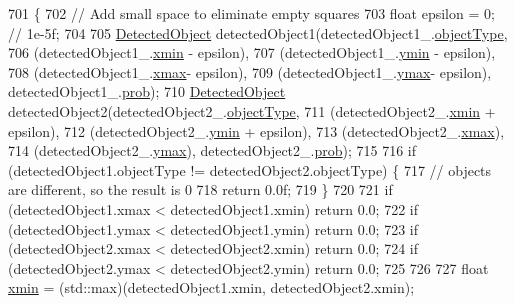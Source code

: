 \begin{DoxyCode}
701                                                                                                      \{
702         \textcolor{comment}{// Add small space to eliminate empty squares}
703         \textcolor{keywordtype}{float} epsilon = 0;  \textcolor{comment}{// 1e-5f;}
704 
705         \hyperlink{classDetectedObject}{DetectedObject} detectedObject1(detectedObject1\_.\hyperlink{classDetectedObject_aff19c53a4ee1d27656acf6b6fbd9cfa0}{objectType},
706                 (detectedObject1\_.\hyperlink{classDetectedObject_af6a124efdbada32ae6cc6ed8207957ba}{xmin} - epsilon),
707                 (detectedObject1\_.\hyperlink{classDetectedObject_a18ef6bb15e7c47d41d9c2c9d4b8b133c}{ymin} - epsilon),
708                 (detectedObject1\_.\hyperlink{classDetectedObject_a8e120d3f08cb0f6c41b10a082bd0df04}{xmax}- epsilon),
709                 (detectedObject1\_.\hyperlink{classDetectedObject_ab130fc061e711904966077c8b8e294e7}{ymax}- epsilon), detectedObject1\_.\hyperlink{classDetectedObject_a1d49d73edce36d93ee88b202bdcb961d}{prob});
710         \hyperlink{classDetectedObject}{DetectedObject} detectedObject2(detectedObject2\_.\hyperlink{classDetectedObject_aff19c53a4ee1d27656acf6b6fbd9cfa0}{objectType},
711                 (detectedObject2\_.\hyperlink{classDetectedObject_af6a124efdbada32ae6cc6ed8207957ba}{xmin} + epsilon),
712                 (detectedObject2\_.\hyperlink{classDetectedObject_a18ef6bb15e7c47d41d9c2c9d4b8b133c}{ymin} + epsilon),
713                 (detectedObject2\_.\hyperlink{classDetectedObject_a8e120d3f08cb0f6c41b10a082bd0df04}{xmax}),
714                 (detectedObject2\_.\hyperlink{classDetectedObject_ab130fc061e711904966077c8b8e294e7}{ymax}), detectedObject2\_.\hyperlink{classDetectedObject_a1d49d73edce36d93ee88b202bdcb961d}{prob});
715 
716         \textcolor{keywordflow}{if} (detectedObject1.objectType != detectedObject2.objectType) \{
717             \textcolor{comment}{// objects are different, so the result is 0}
718             \textcolor{keywordflow}{return} 0.0f;
719         \}
720 
721         \textcolor{keywordflow}{if} (detectedObject1.xmax < detectedObject1.xmin) \textcolor{keywordflow}{return} 0.0;
722         \textcolor{keywordflow}{if} (detectedObject1.ymax < detectedObject1.ymin) \textcolor{keywordflow}{return} 0.0;
723         \textcolor{keywordflow}{if} (detectedObject2.xmax < detectedObject2.xmin) \textcolor{keywordflow}{return} 0.0;
724         \textcolor{keywordflow}{if} (detectedObject2.ymax < detectedObject2.ymin) \textcolor{keywordflow}{return} 0.0;
725 
726 
727         \textcolor{keywordtype}{float} \hyperlink{classDetectedObject_af6a124efdbada32ae6cc6ed8207957ba}{xmin} = (std::max)(detectedObject1.xmin, detectedObject2.xmin);

\end{DoxyCode}

